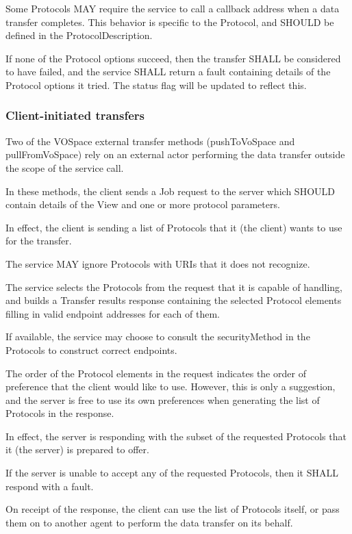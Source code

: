\documentclass[11pt,a4paper]{ivoa}
\begin{document}
Some Protocols MAY require the service to call a callback address when a data transfer completes. This behavior is specific to the Protocol, and SHOULD be defined in the ProtocolDescription.

If none of the Protocol options succeed, then the transfer SHALL be considered to have failed, and the service SHALL return a fault containing details of the Protocol options it tried. The status flag will be updated to reflect this.

\subsubsection{Client-initiated transfers}
\label{subsubsec:client-initiated transfers}
Two of the VOSpace external transfer methods (pushToVoSpace and pullFromVoSpace) rely on an external actor performing the data transfer outside the scope of the service call.

In these methods, the client sends a Job request to the server which SHOULD contain details of the View and one or more protocol parameters.

In effect, the client is sending a list of Protocols that it (the client) wants to use for the transfer.

The service MAY ignore Protocols with URIs that it does not recognize.

The service selects the Protocols from the request that it is capable of handling, and builds a Transfer results response containing the selected Protocol elements filling in valid endpoint addresses for each of them.

If available, the service may choose to consult the securityMethod in the Protocols to construct correct endpoints.

The order of the Protocol elements in the request indicates the order of preference that the client would like to use. However, this is only a suggestion, and the server is free to use its own preferences when generating the list of Protocols in the response.

In effect, the server is responding with the subset of the requested Protocols that it (the server) is prepared to offer.

If the server is unable to accept any of the requested Protocols, then it SHALL respond with a fault.

On receipt of the response, the client can use the list of Protocols itself, or pass them on to another agent to perform the data transfer on its behalf.
\end{document}
